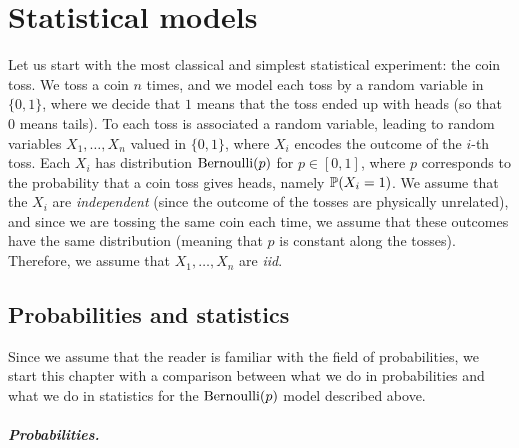 \setchapterpreamble[u]{\margintoc}
\chapter{Statistical models}
\label{chap:statistical_models}

Let us start with the most classical and simplest statistical experiment: the coin toss.
We toss a coin $n$ times, and we model each toss by a random variable in $\{ 0, 1 \}$, where we decide that $1$ means that the toss ended up with heads (so that $0$ means tails).
To each toss is associated a random variable, leading to random variables $X_1, \ldots, X_n$  valued in $\{ 0, 1 \}$, where $X_i$ encodes the outcome of the $i$-th toss.
Each $X_i$ has distribution $\ber(p)$ for $p \in [0, 1]$, where $p$ corresponds to the probability that a coin toss gives heads, namely $\P(X_i = 1)$.%
We assume that the $X_i$ are \emph{independent} (since the outcome of the tosses are physically unrelated), and since we are tossing the same coin each time, we assume that these outcomes have the same distribution (meaning that $p$ is constant along the tosses).
Therefore, we assume that $X_1, \ldots, X_n$ are \emph{iid}.%

\section{Probabilities and statistics} %
\label{sec:probability_versus_statistics}

Since we assume that the reader is familiar with the field of probabilities, we start this chapter with a comparison between what we do in probabilities and what we do in statistics for the $\ber(p)$ model described above.



\paragraph{Probabilities.} %

